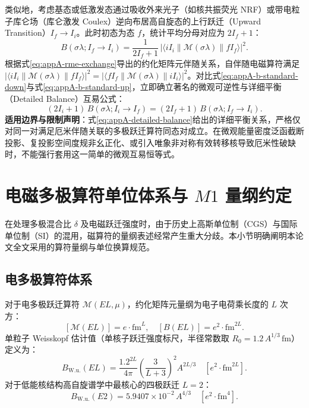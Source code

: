 类似地，考虑基态或低激发态通过吸收外来光子（如核共振荧光 NRF）或带电粒子库仑场（库仑激发 Coulex）逆向布居高自旋态的上行跃迁（Upward Transition）$I_f \to I_i$。此时初态为态 $f$，统计平均分母对应为 $2I_f + 1$：
\begin{equation}\label{eq:appA-b-standard-up}
B(\sigma\lambda; I_f \to I_i) = \frac{1}{2I_f + 1} \, |\langle i I_i \| \mathcal{M}(\sigma\lambda) \| f I_f \rangle|^2 .
\end{equation}
根据式\eqref{eq:appA-rme-exchange}导出的约化矩阵元伴随关系，自伴随电磁算符满足 $|\langle i I_i \| \mathcal{M}(\sigma\lambda) \| f I_f \rangle|^2 = |\langle f I_f \| \mathcal{M}(\sigma\lambda) \| i I_i \rangle|^2$。对比式\eqref{eq:appA-b-standard-down}与式\eqref{eq:appA-b-standard-up}，立即确立著名的微观可逆性与详细平衡（Detailed Balance）互易公式：
\begin{equation}\label{eq:appA-detailed-balance}
(2I_i + 1) \, B(\sigma\lambda; I_i \to I_f) = (2I_f + 1) \, B(\sigma\lambda; I_f \to I_i) .
\end{equation}
\textbf{适用边界与限制声明}：式\eqref{eq:appA-detailed-balance}给出的详细平衡关系，严格仅对同一对满足厄米伴随关联的多极跃迁算符同态对成立。在微观能量密度泛函截断投影、复投影空间度规非幺正化、或引入唯象非对称有效转移核导致厄米性破缺时，不能强行套用这一简单的微观互易恒等式。

\section{电磁多极算符单位体系与 $M1$ 量纲约定}\label{sec:appA-6}

在处理多极混合比 $\delta$ 及电磁跃迁强度时，由于历史上高斯单位制（CGS）与国际单位制（SI）的混用，磁算符的量纲表述经常产生重大分歧。本小节明确阐明本论文全文采用的算符量纲与单位换算规范。

\subsection{电多极算符体系}
对于电多极跃迁算符 $\mathcal{M}(EL, \mu)$，约化矩阵元量纲为电子电荷乘长度的 $L$ 次方：
\begin{equation}\label{eq:appA-el-units}
[\mathcal{M}(EL)] = e \cdot \mathrm{fm}^L , \quad [B(EL)] = e^2 \cdot \mathrm{fm}^{2L} .
\end{equation}
单粒子 Weisskopf 估计值（单核子跃迁强度标尺，半径常数取 $R_0 = 1.2\,A^{1/3}\,\mathrm{fm}$）定义为：
\begin{equation}\label{eq:appA-weisskopf-el}
B_{\mathrm{W.u.}}(EL) = \frac{1.2^{2L}}{4\pi} \left( \frac{3}{L+3} \right)^2 A^{2L/3} \quad [e^2 \cdot \mathrm{fm}^{2L}] .
\end{equation}
对于低能核结构高自旋谱学中最核心的四极跃迁 $L=2$：
\begin{equation}\label{eq:appA-be2-wu}
B_{\mathrm{W.u.}}(E2) = 5.9407 \times 10^{-2} \, A^{4/3} \quad [e^2 \cdot \mathrm{fm}^4] .
\end{equation}


